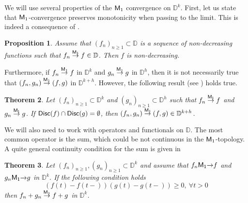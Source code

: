 \documentclass[]{amsart}
\numberwithin{equation}{section}
\newtheorem{thm}{Theorem}[section]
\newtheorem{prop}[thm]{Proposition}
\theoremstyle{remark}
\newtheorem{rmk}[thm]{Remark}
\theoremstyle{definition}
\begin{document}
We will use several properties of the ${\sf M}_1$ convergence on $\mathbb{D}^k$. First, let us state that ${\sf M}_1$-convergence preserves monotonicity when passing to the limit. This is indeed a consequence of \cite[Corollary 12.5.1]{whitt2002stochastic}.
\begin{prop}\label{prop:premon}
	Assume that $(f_n)_{n \ge 1} \subset \mathbb{D}$ is a sequence of non-decreasing functions such that $f_n \overset{\sf M_1}{\to}f \in \mathbb{D}$. Then $f$ is non-decreasing.
\end{prop}
Furthermore, if $f_n \overset{{\sf M}_1}{\to} f$ in $\mathbb{D}^k$ and $g_n \overset{{\sf M}_1}{\to} g$ in $\mathbb{D}^h$, then it is not necessarily true that $(f_n,g_n) \overset{{\sf M}_1}{\to} (f,g)$ in $\mathbb{D}^{k+h}$. However, the following result (see \cite[Theorem 12.6.1]{whitt2002stochastic}) holds true. 
\begin{thm}\label{thm:prodconv}
	Let $(f_n)_{n \ge 1} \subset \mathbb{D}^k$ and $(g_n)_{n \ge 1}\subset \mathbb{D}^{h}$ such that $f_n \overset{\sf M_1}{\to}f$ and $g_n \overset{\sf M_1}{\to} g$. If ${\sf Disc}(f)\cap {\sf Disc}(g)=\emptyset$, then $(f_n,g_n)\overset{\sf M_1}{\to}(f,g) \in \mathbb{D}^{k+h}$.
\end{thm}
We will also need to work with operators and functionals on $\mathbb{D}$. The most common operator is the sum, which could be not continuous in the ${\sf M}_1$-topology. A quite general continuity condition for the sum is given in \cite[Theorem 2.7.3]{whitt2002stochastic}
\begin{thm}\label{thm:contsum}
	Let $(f_n)_{n \ge 1}, (g_n)_{n \ge 1}\subset \mathbb{D}^k$ and assume that $f_n {\sf M_1}{\to} f$ and $g_n {\sf M_1}{\to} g$ in $\mathbb{D}^k$. If the following condition holds
	\begin{equation}\label{eq:samejump}
		(f(t)-f(t-))(g(t)-g(t-)) \ge 0, \ \forall t>0
	\end{equation}
	then $f_n+g_n \overset{{\sf M}_1}{\to} f+g$ in $\mathbb{D}^k$.
\end{thm}
\end{document}
